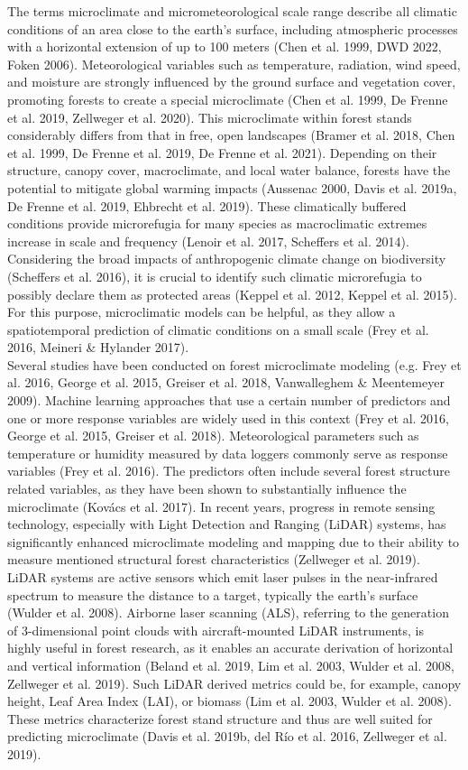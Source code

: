 \documentclass[5p]{elsarticle} %
\begin{document}
The terms microclimate and micrometeorological scale range describe all climatic conditions of an area close to the earth’s surface, including atmospheric processes with a horizontal extension of up to 100 meters (Chen et al. 1999, DWD 2022, Foken 2006). Meteorological variables such as temperature, radiation, wind speed, and moisture are strongly influenced by the ground surface and vegetation cover, promoting forests to create a special microclimate (Chen et al. 1999, De Frenne et al. 2019, Zellweger et al. 2020). This microclimate within forest stands considerably differs from that in free, open landscapes (Bramer et al. 2018, Chen et al. 1999, De Frenne et al. 2019, De Frenne et al. 2021). Depending on their structure, canopy cover, macroclimate, and local water balance, forests have the potential to mitigate global warming impacts (Aussenac 2000, Davis et al. 2019a, De Frenne et al. 2019, Ehbrecht et al. 2019). These climatically buffered conditions provide microrefugia for many species as macroclimatic extremes increase in scale and frequency (Lenoir et al. 2017, Scheffers et al. 2014). Considering the broad impacts of anthropogenic climate change on biodiversity (Scheffers et al. 2016), it is crucial to identify such climatic microrefugia to possibly declare them as protected areas (Keppel et al. 2012, Keppel et al. 2015). For this purpose, microclimatic models can be helpful, as they allow a spatiotemporal prediction of climatic conditions on a small scale (Frey et al. 2016, Meineri \& Hylander 2017).\\
Several studies have been conducted on forest microclimate modeling (e.g. Frey et al. 2016, George et al. 2015, Greiser et al. 2018, Vanwalleghem \& Meentemeyer 2009). Machine learning approaches that use a certain number of predictors and one or more response variables are widely used in this context (Frey et al. 2016, George et al. 2015, Greiser et al. 2018). Meteorological parameters such as temperature or humidity measured by data loggers commonly serve as response variables (Frey et al. 2016). The predictors often include several forest structure related variables, as they have been shown to substantially influence the microclimate (Kovács et al. 2017). In recent years, progress in remote sensing technology, especially with Light Detection and Ranging (LiDAR) systems, has significantly enhanced microclimate modeling and mapping due to their ability to measure mentioned structural forest characteristics (Zellweger et al. 2019). LiDAR systems are active sensors which emit laser pulses in the near-infrared spectrum to measure the distance to a target, typically the earth’s surface (Wulder et al. 2008). Airborne laser scanning (ALS), referring to the generation of 3-dimensional point clouds with aircraft-mounted LiDAR instruments, is highly useful in forest research, as it enables an accurate derivation of horizontal and vertical information (Beland et al. 2019, Lim et al. 2003, Wulder et al. 2008, Zellweger et al. 2019). Such LiDAR derived metrics could be, for example, canopy height, Leaf Area Index (LAI), or biomass (Lim et al. 2003, Wulder et al. 2008). These metrics characterize forest stand structure and thus are well suited for predicting microclimate (Davis et al. 2019b, del Río et al. 2016, Zellweger et al. 2019).\\
\end{document}
